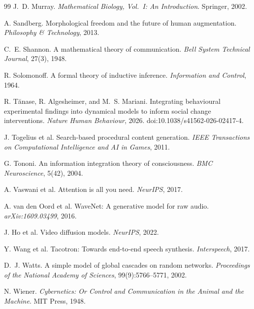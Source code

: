 \documentclass[12pt,a4paper]{article}
\theoremstyle{plain}
\theoremstyle{definition}
\begin{document}
\begin{thebibliography}{99}
J.~D. Murray.
\newblock \emph{Mathematical Biology, Vol.~I: An Introduction}.
\newblock Springer, 2002.

A. Sandberg.
\newblock Morphological freedom and the future of human augmentation.
\newblock \emph{Philosophy \& Technology}, 2013.

C.~E. Shannon.
\newblock A mathematical theory of communication.
\newblock \emph{Bell System Technical Journal}, 27(3), 1948.

R. Solomonoff.
\newblock A formal theory of inductive inference.
\newblock \emph{Information and Control}, 1964.

R. T\u{a}nase, R. Algesheimer, and M.~S. Mariani.
\newblock Integrating behavioural experimental findings into dynamical models
  to inform social change interventions.
\newblock \emph{Nature Human Behaviour}, 2026.
\newblock doi:10.1038/s41562-026-02417-4.

J. Togelius et al.
\newblock Search-based procedural content generation.
\newblock \emph{IEEE Transactions on Computational Intelligence and AI in Games}, 2011.

G. Tononi.
\newblock An information integration theory of consciousness.
\newblock \emph{BMC Neuroscience}, 5(42), 2004.

A. Vaswani et al.
\newblock Attention is all you need.
\newblock \emph{NeurIPS}, 2017.

A. van den Oord et al.
\newblock WaveNet: A generative model for raw audio.
\newblock \emph{arXiv:1609.03499}, 2016.

J. Ho et al.
\newblock Video diffusion models.
\newblock \emph{NeurIPS}, 2022.

Y. Wang et al.
\newblock Tacotron: Towards end-to-end speech synthesis.
\newblock \emph{Interspeech}, 2017.

D.~J. Watts.
\newblock A simple model of global cascades on random networks.
\newblock \emph{Proceedings of the National Academy of Sciences},
  99(9):5766--5771, 2002.

N. Wiener.
\newblock \emph{Cybernetics: Or Control and Communication in the Animal and
  the Machine}.
\newblock MIT Press, 1948.

\end{thebibliography}
\end{document}
